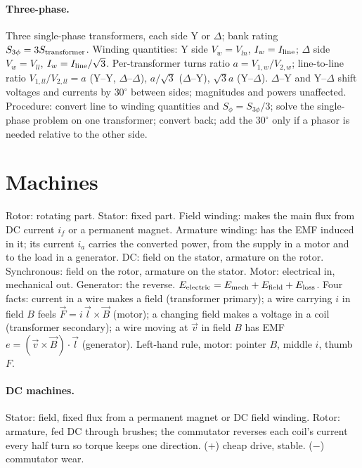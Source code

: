 \documentclass{article}
\begin{document}
\paragraph{Three-phase.}
Three single-phase transformers, each side Y or $\Delta$; bank rating $S_{3\phi} = 3 S_{\rm transformer}$.
Winding quantities: Y side $V_w = V_{ln}$, $I_w = I_{\rm line}$; $\Delta$ side $V_w = V_{ll}$, $I_w = I_{\rm line}/\sqrt3$.
Per-transformer turns ratio $a = V_{1,w}/V_{2,w}$; line-to-line ratio $V_{1,ll}/V_{2,ll} = a$ (Y--Y, $\Delta$--$\Delta$), $a/\sqrt3$ ($\Delta$--Y), $\sqrt3 a$ (Y--$\Delta$).
$\Delta$--Y and Y--$\Delta$ shift voltages and currents by $30^\circ$ between sides; magnitudes and powers unaffected.
Procedure: convert line to winding quantities and $S_\phi = S_{3\phi}/3$; solve the single-phase problem on one transformer; convert back; add the $30^\circ$ only if a phasor is needed relative to the other side.




\section{Machines}
Rotor: rotating part. Stator: fixed part.
Field winding: makes the main flux from DC current $i_f$ or a permanent magnet.
Armature winding: has the EMF induced in it; its current $i_a$ carries the converted power, from the supply in a motor and to the load in a generator.
DC: field on the stator, armature on the rotor. Synchronous: field on the rotor, armature on the stator.
Motor: electrical in, mechanical out. Generator: the reverse.
$E_{\rm electric} = E_{\rm mech} + E_{\rm field} + E_{\rm loss}$.
Four facts: current in a wire makes a field (transformer primary); a wire carrying $i$ in field $B$ feels $\vec F = i\,\vec l\times\vec B$ (motor); a changing field makes a voltage in a coil (transformer secondary); a wire moving at $\vec v$ in field $B$ has EMF $e = (\vec v\times\vec B)\cdot\vec l$ (generator).
Left-hand rule, motor: pointer $B$, middle $i$, thumb $F$.

\paragraph{DC machines.}
Stator: field, fixed flux from a permanent magnet or DC field winding. Rotor: armature, fed DC through brushes; the commutator reverses each coil's current every half turn so torque keeps one direction.
(+) cheap drive, stable. ($-$) commutator wear.
\end{document}
